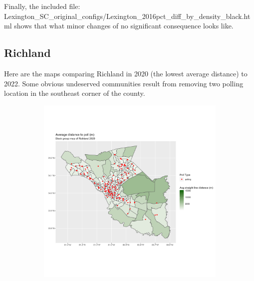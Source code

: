 \documentclass[11pt]{article}
\theoremstyle{remark}
\theoremstyle{definition}
\begin{document}
Finally, the included file: \textrm{Lexington\_SC\_original\_configs/Lexington\_2016pct\_diff\_by\_density\_black.html} shows that what minor changes of no significant consequence looks like. 
\pagebreak

\subsection{Richland}
Here are the maps comparing Richland in 2020 (the lowest average distance) to 2022. Some obvious undeserved communities result from removing two polling location in the southeast corner of the county.


\begin{figure}
	\begin{subfigure}{.5\textwidth}
		\centering
		\includegraphics[width=\linewidth]{result_analysis/Richland_SC_original_configs/distance_map_Richland_config_original_2020_polls.png}
		\label{sfig:York_2020_bg_dist}
	\end{subfigure} 
	\begin{subfigure}{.5\textwidth}
		\centering

\end{subfigure}
\end{figure}
\end{document}
